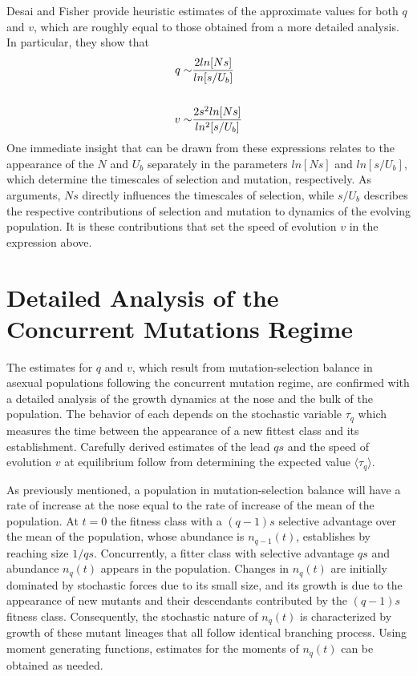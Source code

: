 \documentclass[12pt, one column]{article}
\begin{document}
Desai and Fisher provide heuristic estimates of the approximate values for both $q$ and $v$, which are roughly equal to those obtained from a more detailed analysis.  In particular, they show that
\begin{equation}
\begin{aligned}
q \sim & {2ln[Ns] \over ln[s/U_b]} \\   
\\
v \sim & {2s^2ln[Ns] \over ln^2[s/U_b]}
\end{aligned}
\end{equation}
One immediate insight that can be drawn from these expressions relates to the appearance of the $N$ and $U_b$ separately in the parameters $ln[Ns]$ and $ln[s/U_b]$, which determine the timescales of selection and mutation, respectively.  As arguments, $Ns$ directly influences the timescales of selection, while $s/U_b$ describes the respective contributions of selection and mutation to dynamics of the evolving population.  It is these contributions that set the speed of evolution $v$ in the expression above.   

\section*{Detailed Analysis of the Concurrent Mutations Regime}
The estimates for $q$ and $v$, which result from mutation-selection balance in asexual populations following the concurrent mutation regime, are confirmed with a detailed analysis of the growth dynamics at the nose and the bulk of the population.  The behavior of each depends on the stochastic variable $\tau_q$ which measures the time between the appearance of a new fittest class and its establishment.  Carefully derived estimates of the lead $qs$ and the speed of evolution $v$ at equilibrium follow from determining the expected value $\langle \tau_q \rangle$.   

As previously mentioned, a population in mutation-selection balance will have a rate of increase at the nose equal to the rate of increase of the mean of the population.  At $t=0$ the fitness class with a $(q-1)s$ selective advantage over the mean of the population, whose abundance is $n_{q-1}(t)$, establishes by reaching size $1/qs$.  Concurrently, a fitter class with selective advantage $qs$ and abundance $n_q(t)$ appears in the population.  Changes in $n_q(t)$ are initially dominated by stochastic forces due to its small size, and its growth is due to the appearance of new mutants and their descendants contributed by the $(q-1)s$ fitness class. Consequently, the stochastic nature of $n_q(t)$ is characterized by growth of these mutant lineages that all follow identical branching process.  Using moment generating functions, estimates for the moments of $n_q(t)$ can be obtained as needed.
\end{document}
